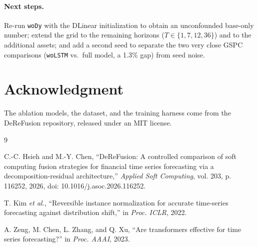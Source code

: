 \documentclass[conference]{IEEEtran}
\begin{document}
\paragraph{Next steps.} Re-run \texttt{woDy} with the DLinear
initialization to obtain an unconfounded base-only number; extend the grid
to the remaining horizons ($T\in\{1,7,12,36\}$) and to the additional
assets; and add a second seed to separate the two very close GSPC
comparisons (\texttt{woLSTM} vs.\ full model, a 1.3\% gap) from seed noise.

\section*{Acknowledgment}

The ablation models, the dataset, and the training harness come from the
DeReFusion repository, released under an MIT license.

\begin{thebibliography}{9}

C.-C. Hsieh and M.-Y. Chen,
``DeReFusion: A controlled comparison of soft computing fusion strategies
for financial time series forecasting via a decomposition-residual
architecture,'' \emph{Applied Soft Computing}, vol. 203, p. 116252, 2026,
doi: 10.1016/j.asoc.2026.116252.

T. Kim \emph{et al.}, ``Reversible instance normalization for accurate
time-series forecasting against distribution shift,'' in \emph{Proc. ICLR},
2022.

A. Zeng, M. Chen, L. Zhang, and Q. Xu, ``Are transformers effective for time
series forecasting?'' in \emph{Proc. AAAI}, 2023.

\end{thebibliography}
\end{document}

